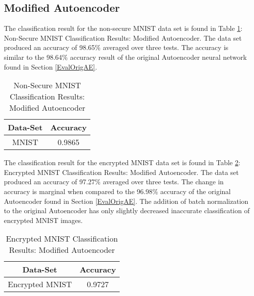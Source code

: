 \documentclass[12pt, titlepage]{article}
\begin{document}
\subsection{Modified Autoencoder}\label{EvalModAE}

The classification result for the non-secure MNIST data set is found in Table \ref{table:modAE_MNIST}: Non-Secure MNIST Classification Results: Modified Autoencoder. The data set produced an accuracy of 98.65\% averaged over three tests. The accuracy is similar to the 98.64\% accuracy result of the original Autoencoder neural network found in Section \ref{EvalOrigAE}.\\ 

\begin{table}[!h]
	\begin{center}
		\begin{tabular}{| c | c |}
			\hline
			\textbf{Data-Set} & \textbf{Accuracy}\\
			\hline
			MNIST & 0.9865\\
			\hline
		\end{tabular}
		\caption{Non-Secure MNIST Classification Results: Modified Autoencoder}
		\label{table:modAE_MNIST}
	\end{center}
\end{table}

\noindent The classification result for the encrypted MNIST data set is found in Table \ref{table:modAE_Encryption}: Encrypted MNIST Classification Results: Modified Autoencoder. The data set produced an accuracy of 97.27\% averaged over three tests. The change in accuracy is marginal when compared to the 96.98\% accuracy of the original Autoencoder found in Section \ref{EvalOrigAE}. The addition of batch normalization to the original Autoencoder has only slightly decreased inaccurate classification of encrypted MNIST images.\\

\begin{table}[!h]
	\begin{center}
		\begin{tabular}{| c | c |}
			\hline
			\textbf{Data-Set} & \textbf{Accuracy}\\
			\hline
			Encrypted MNIST & 0.9727\\
			\hline
		\end{tabular}
		\caption{Encrypted MNIST Classification Results: Modified Autoencoder}
		\label{table:modAE_Encryption}
	\end{center}
\end{table}
\end{document}
